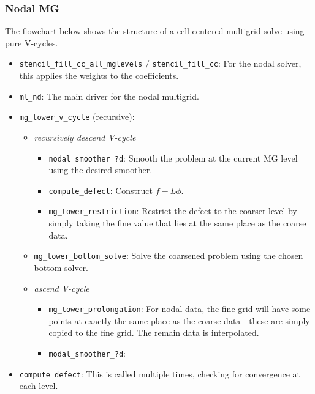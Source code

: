 \subsubsection{Nodal MG}

The flowchart below shows the structure of a cell-centered multigrid
solve using pure V-cycles.


\begin{itemize}

\item {\tt stencil\_fill\_cc\_all\_mglevels} / {\tt stencil\_fill\_cc}:
  For the nodal solver, this applies the weights to the 
  coefficients. 

\item {\tt ml\_nd}: The main driver for the nodal multigrid.

\item {\tt mg\_tower\_v\_cycle} (recursive):
\begin{itemize}

  \item {\em recursively descend V-cycle}
  \begin{itemize} 
  \item {\tt nodal\_smoother\_?d}: Smooth the 
    problem at the current MG level using the desired smoother.

  \item {\tt compute\_defect}: Construct $f - L\phi$.

  \item {\tt mg\_tower\_restriction}:  Restrict
    the defect to the coarser level by simply taking the fine value that
    lies at the same place as the coarse data.
  \end{itemize}

  \item {\tt mg\_tower\_bottom\_solve}:  Solve the coarsened problem
    using the chosen bottom solver.

  \item {\em ascend V-cycle}

  \begin{itemize}
  \item {\tt mg\_tower\_prolongation}: For nodal data, the fine grid
     will have some points at exactly the same place as the coarse data---these are
     simply copied to the fine grid.  The remain data is interpolated.

  \item {\tt modal\_smoother\_?d}:
  \end{itemize}

\end{itemize}
\item {\tt compute\_defect}: This is called multiple times, checking for
   convergence at each level.


\end{itemize}






